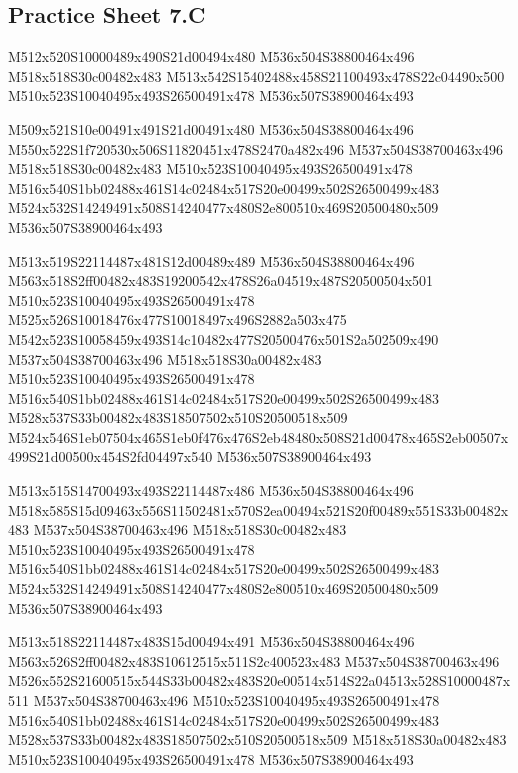 \documentclass{article}
\begin{document}
\subsection{Practice Sheet 7.C}

\begin{multicols}{5}
\begin{center}

M512x520S10000489x490S21d00494x480 %
M536x504S38800464x496 %
M518x518S30c00482x483 %
M513x542S15402488x458S21100493x478S22c04490x500 %
M510x523S10040495x493S26500491x478 %
M536x507S38900464x493 %
\vfil
\columnbreak

M509x521S10e00491x491S21d00491x480 %
M536x504S38800464x496 %
M550x522S1f720530x506S11820451x478S2470a482x496 %
M537x504S38700463x496 %
M518x518S30c00482x483 %
M510x523S10040495x493S26500491x478 %
M516x540S1bb02488x461S14c02484x517S20e00499x502S26500499x483 %
M524x532S14249491x508S14240477x480S2e800510x469S20500480x509 %
M536x507S38900464x493 %
\vfil
\columnbreak

M513x519S22114487x481S12d00489x489 %
M536x504S38800464x496 %
M563x518S2ff00482x483S19200542x478S26a04519x487S20500504x501 %
M510x523S10040495x493S26500491x478 %
M525x526S10018476x477S10018497x496S2882a503x475 %
M542x523S10058459x493S14c10482x477S20500476x501S2a502509x490 %
M537x504S38700463x496 %
M518x518S30a00482x483 %
M510x523S10040495x493S26500491x478 %
M516x540S1bb02488x461S14c02484x517S20e00499x502S26500499x483 %
M528x537S33b00482x483S18507502x510S20500518x509 %
M524x546S1eb07504x465S1eb0f476x476S2eb48480x508S21d00478x465S2eb00507x499S21d00500x454S2fd04497x540 %
M536x507S38900464x493 %
\vfil
\columnbreak

M513x515S14700493x493S22114487x486 %
M536x504S38800464x496 %
M518x585S15d09463x556S11502481x570S2ea00494x521S20f00489x551S33b00482x483 %
M537x504S38700463x496 %
M518x518S30c00482x483 %
M510x523S10040495x493S26500491x478 %
M516x540S1bb02488x461S14c02484x517S20e00499x502S26500499x483 %
M524x532S14249491x508S14240477x480S2e800510x469S20500480x509 %
M536x507S38900464x493 %
\vfil
\columnbreak

M513x518S22114487x483S15d00494x491 %
M536x504S38800464x496 %
M563x526S2ff00482x483S10612515x511S2c400523x483 %
M537x504S38700463x496 %
M526x552S21600515x544S33b00482x483S20e00514x514S22a04513x528S10000487x511 %
M537x504S38700463x496 %
M510x523S10040495x493S26500491x478 %
M516x540S1bb02488x461S14c02484x517S20e00499x502S26500499x483 %
M528x537S33b00482x483S18507502x510S20500518x509 %
M518x518S30a00482x483 %
M510x523S10040495x493S26500491x478 %
M536x507S38900464x493 %
\vfil

\end{center}
\end{multicols}
\end{document}
